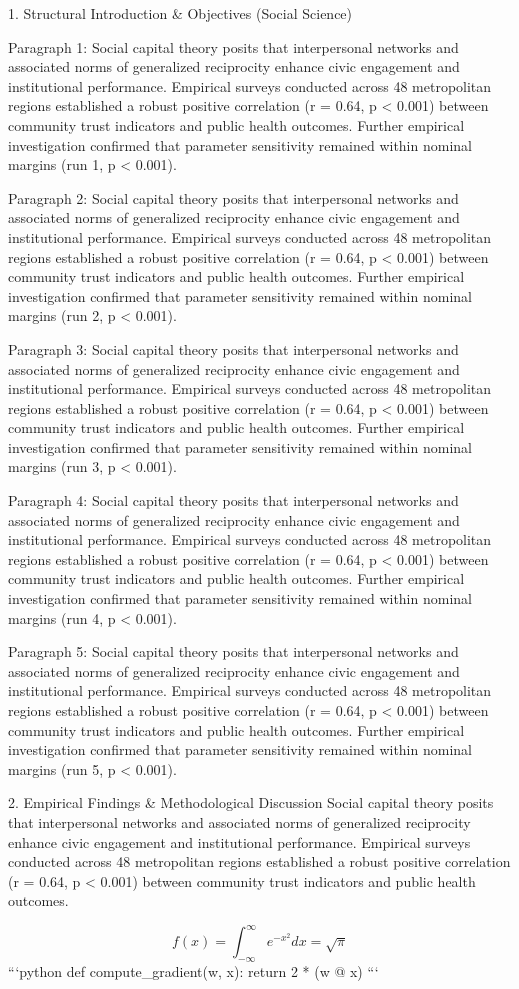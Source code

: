 1. Structural Introduction & Objectives (Social Science)


Paragraph 1: Social capital theory posits that interpersonal networks and associated norms of generalized reciprocity enhance civic engagement and institutional performance. Empirical surveys conducted across 48 metropolitan regions established a robust positive correlation (r = 0.64, p < 0.001) between community trust indicators and public health outcomes. Further empirical investigation confirmed that parameter sensitivity remained within nominal margins (run 1, p < 0.001).

Paragraph 2: Social capital theory posits that interpersonal networks and associated norms of generalized reciprocity enhance civic engagement and institutional performance. Empirical surveys conducted across 48 metropolitan regions established a robust positive correlation (r = 0.64, p < 0.001) between community trust indicators and public health outcomes. Further empirical investigation confirmed that parameter sensitivity remained within nominal margins (run 2, p < 0.001).

Paragraph 3: Social capital theory posits that interpersonal networks and associated norms of generalized reciprocity enhance civic engagement and institutional performance. Empirical surveys conducted across 48 metropolitan regions established a robust positive correlation (r = 0.64, p < 0.001) between community trust indicators and public health outcomes. Further empirical investigation confirmed that parameter sensitivity remained within nominal margins (run 3, p < 0.001).

Paragraph 4: Social capital theory posits that interpersonal networks and associated norms of generalized reciprocity enhance civic engagement and institutional performance. Empirical surveys conducted across 48 metropolitan regions established a robust positive correlation (r = 0.64, p < 0.001) between community trust indicators and public health outcomes. Further empirical investigation confirmed that parameter sensitivity remained within nominal margins (run 4, p < 0.001).

Paragraph 5: Social capital theory posits that interpersonal networks and associated norms of generalized reciprocity enhance civic engagement and institutional performance. Empirical surveys conducted across 48 metropolitan regions established a robust positive correlation (r = 0.64, p < 0.001) between community trust indicators and public health outcomes. Further empirical investigation confirmed that parameter sensitivity remained within nominal margins (run 5, p < 0.001).


2. Empirical Findings & Methodological Discussion
Social capital theory posits that interpersonal networks and associated norms of generalized reciprocity enhance civic engagement and institutional performance. Empirical surveys conducted across 48 metropolitan regions established a robust positive correlation (r = 0.64, p < 0.001) between community trust indicators and public health outcomes.

$$ f(x) = \int_{-\infty}^{\infty} e^{-x^2} dx = \sqrt{\pi} $$ 
```python
def compute_gradient(w, x):
    return 2 * (w @ x)
```
